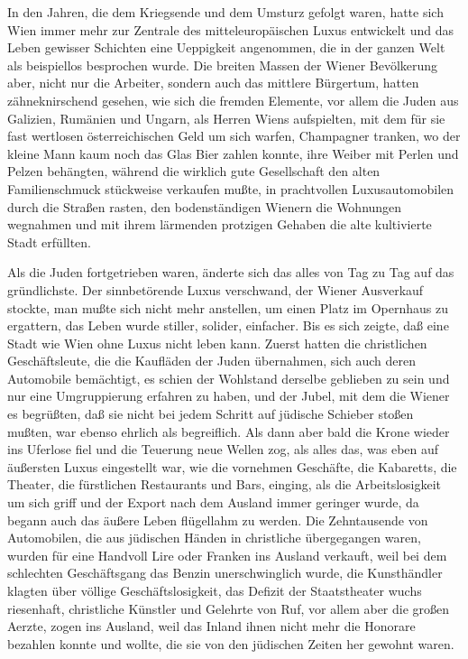 In den Jahren, die dem Kriegsende und dem Umsturz gefolgt waren,
hatte sich Wien immer mehr zur Zentrale des mitteleuropäischen
Luxus entwickelt und das Leben gewisser Schichten eine Ueppigkeit
angenommen, die in der ganzen Welt als beispiellos besprochen
wurde. Die breiten Massen der Wiener Bevölkerung aber, nicht nur
die Arbeiter, sondern auch das mittlere Bürgertum, hatten
zähneknirschend gesehen, wie sich die fremden Elemente, vor allem
die Juden aus Galizien, Rumänien und Ungarn, als Herren Wiens
aufspielten, mit dem für sie fast wertlosen österreichischen Geld
um sich warfen, Champagner tranken, wo der kleine Mann kaum noch
das Glas Bier  zahlen konnte, ihre Weiber mit Perlen
und Pelzen behängten, während die wirklich gute Gesellschaft den
alten Familienschmuck stückweise verkaufen mußte, in prachtvollen
Luxusautomobilen durch die Straßen rasten, den bodenständigen
Wienern die Wohnungen wegnahmen und mit ihrem lärmenden protzigen
Gehaben die alte kultivierte Stadt erfüllten.

Als die Juden fortgetrieben waren, änderte sich das alles von Tag
zu Tag auf das gründlichste. Der sinnbetörende Luxus verschwand,
der Wiener Ausverkauf stockte, man mußte sich nicht mehr anstellen,
um einen Platz im Opernhaus zu ergattern, das Leben wurde stiller,
solider, einfacher. Bis es sich zeigte, daß eine Stadt wie Wien
ohne Luxus nicht leben kann. Zuerst hatten die christlichen
Geschäftsleute, die die Kaufläden der Juden übernahmen, sich auch
deren Automobile bemächtigt, es schien der Wohlstand derselbe
geblieben zu sein und nur eine Umgruppierung erfahren zu haben, und
der Jubel, mit dem die Wiener es begrüßten, daß sie nicht bei jedem
Schritt auf jüdische Schieber stoßen mußten, war ebenso ehrlich als
begreiflich. Als dann aber bald die Krone wieder ins Uferlose fiel
und die Teuerung neue Wellen zog, als alles das, was eben auf
äußersten Luxus eingestellt war, wie die vornehmen Geschäfte, die
Kabaretts, die Theater, die fürstlichen Restaurants und Bars,
einging, als die Arbeitslosigkeit um sich griff und der Export nach
dem Ausland immer geringer wurde, da begann auch das äußere Leben
flügellahm zu werden. Die Zehntausende von Automobilen, die aus
jüdischen Händen in christliche  übergegangen waren,
wurden für eine Handvoll Lire oder Franken ins Ausland verkauft,
weil bei dem schlechten Geschäftsgang das Benzin unerschwinglich
wurde, die Kunsthändler klagten über völlige Geschäftslosigkeit,
das Defizit der Staatstheater wuchs riesenhaft, christliche
Künstler und Gelehrte von Ruf, vor allem aber die großen Aerzte,
zogen ins Ausland, weil das Inland ihnen nicht mehr die Honorare
bezahlen konnte und wollte, die sie von den jüdischen Zeiten her
gewohnt waren.

